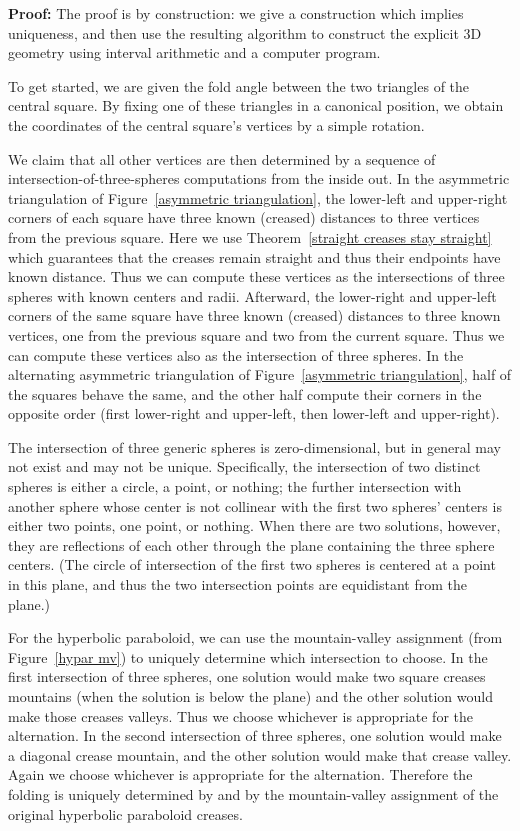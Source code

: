 \documentclass[11pt,letterpaper]{article}
\newenvironment{proof}{\noindent\textbf{Proof: }\ignorespaces}
  {\hspace*{\fill}\medskip}
\begin{document}
\begin{proof}
  The proof is by construction: we give a construction which implies
  uniqueness, and then use the resulting algorithm to construct the explicit
  3D geometry using interval arithmetic and a computer program.

  To get started, we are given the fold angle  between the two
  triangles of the central square.  By fixing one of these triangles in
  a canonical position, we obtain the coordinates of the central square's
  vertices by a simple rotation.

  We claim that all other vertices are then determined by a sequence of
  intersection-of-three-spheres computations from the inside out.
  In the asymmetric triangulation of Figure~\ref{asymmetric triangulation},
  the lower-left and upper-right corners of each square have three known
  (creased) distances to three vertices from the previous square.
  Here we use Theorem~\ref{straight creases stay straight} which guarantees that
  the creases remain straight and thus their endpoints have known distance.
  Thus we can compute these vertices as the intersections of three spheres
  with known centers and radii.  Afterward, the lower-right and upper-left
  corners of the same square have three known (creased) distances to three
  known vertices, one from the previous square and two from the current square.
  Thus we can compute these vertices also as the intersection of three spheres.
  In the alternating asymmetric triangulation of
  Figure~\ref{asymmetric triangulation}, half of the squares behave the same,
  and the other half compute their corners in the opposite order
  (first lower-right and upper-left, then lower-left and upper-right).

  The intersection of three generic spheres is zero-dimensional, but in general
  may not exist and may not be unique.  Specifically, the intersection of
  two distinct spheres is either a circle, a point, or nothing;
  the further intersection with another sphere whose center is not
  collinear with the first two spheres' centers is either two points,
  one point, or nothing.  When there are two solutions, however,
  they are reflections of each other through the plane containing the
  three sphere centers.  (The circle of intersection of the first two
  spheres is centered at a point in this plane, and thus the two
  intersection points are equidistant from the plane.)

  For the hyperbolic paraboloid, we can use the mountain-valley assignment
  (from Figure~\ref{hypar mv}) to uniquely determine which intersection to
  choose.  In the first intersection of three spheres, one solution would make
  two square creases mountains (when the solution is below the plane) and the
  other solution would make those creases valleys.  Thus we choose whichever
  is appropriate for the alternation.  In the second intersection of three
  spheres, one solution would make a diagonal crease mountain, and the other
  solution would make that crease valley.  Again we choose whichever is
  appropriate for the alternation.  Therefore the folding is uniquely
  determined by  and by the mountain-valley assignment of the
  original hyperbolic paraboloid creases.


\end{proof}
\end{document}
